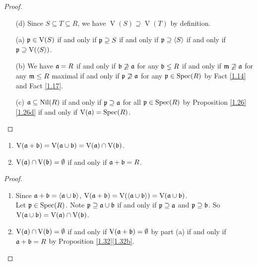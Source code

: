 \begin{proof}
    \begin{enumerate} 
        \item [(d)] Since $S \subseteq T \subseteq R$, we have $\operatorname{V}(S) \supseteq \operatorname{V}(T)$ by definition.
        \item [(a)] $\mathfrak{p} \in \operatorname{V}(S)$ if and only if $\mathfrak{p} \supseteq S$ if and only if $\mathfrak{p} \supseteq \langle S \rangle$ if and only if $\mathfrak{p} \supseteq \operatorname{V}(\langle S \rangle)$.
        \item [(b)]
            We have $\mathfrak{a} = R$ if and only if $\mathfrak{b} \not \supseteq \mathfrak{a}$ for any $\mathfrak{b} \lneq R$ if and only if $\mathfrak{m} \not \supseteq \mathfrak{a}$ for any $\mathfrak{m} \leq R$ maximal if and only if $\mathfrak{p} \not \supseteq \mathfrak{a}$ for any $\mathfrak{p} \in \operatorname{Spec}(R)$ by Fact \ref{1.14} and Fact \ref{1.17}. 
        \item[(c)] $\mathfrak{a} \subseteq \operatorname{Nil}(R)$ if and only if $\mathfrak{p} \supseteq \mathfrak{a}$ for all $\mathfrak{p} \in \operatorname{Spec}(R)$ by Proposition \ref{1.26}\ref{1.26d} if and only if $\operatorname{V}(\mathfrak{a}) = \operatorname{Spec}(R)$. \qedhere
    \end{enumerate}
\end{proof}

\begin{proposition}\label{1.33}
    \begin{enumerate}
        \item\label{1.33a} $\operatorname{V}(\mathfrak{a} + \mathfrak{b}) = \operatorname{V}(\mathfrak{a} \cup \mathfrak{b}) = \operatorname{V}(\mathfrak{a}) \cap \operatorname{V}(\mathfrak{b})$.
        \item\label{1.33b} $\operatorname{V}(\mathfrak{a}) \cap \operatorname{V}(\mathfrak{b}) = \emptyset$ if and only if $\mathfrak{a} + \mathfrak{b} = R$.
    \end{enumerate}
\end{proposition}

\begin{proof}
    \begin{enumerate}
        \item 
            Since $\mathfrak{a} + \mathfrak{b} = \langle \mathfrak{a} \cup \mathfrak{b} \rangle$, $\operatorname{V}(\mathfrak{a} + \mathfrak{b}) = \operatorname{V}(\langle \mathfrak{a} \cup \mathfrak{b} \rangle) = \operatorname{V}(\mathfrak{a} \cup \mathfrak{b})$. \\
            Let $\mathfrak{p} \in \operatorname{Spec}(R)$. Note $\mathfrak{p} \supseteq \mathfrak{a} \cup \mathfrak{b}$ if and only if $\mathfrak{p} \supseteq \mathfrak{a}$ and $\mathfrak{p} \supseteq \mathfrak{b}$. So $\operatorname{V}(\mathfrak{a} \cup \mathfrak{b}) = \operatorname{V}(\mathfrak{a}) \cap \operatorname{V}(\mathfrak{b})$.
        \item 
            $\operatorname{V}(\mathfrak{a}) \cap \operatorname{V}(\mathfrak{b}) = \emptyset$ if and only if $\operatorname{V}(\mathfrak{a} + \mathfrak{b}) = \emptyset$ by part (a) if and only if $\mathfrak{a} + \mathfrak{b} = R$ by Proposition \ref{1.32}\ref{1.32b}. \qedhere
    \end{enumerate}
\end{proof}


